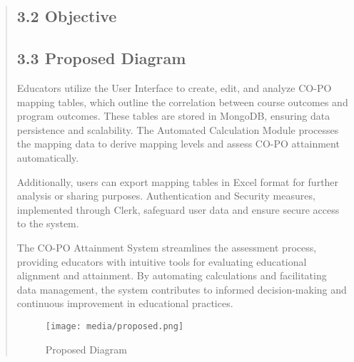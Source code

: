 \documentclass[12pt]{report}
\begin{document}
\begin{quote}
		\clearpage
		
		\subsection{3.2 Objective}
		\hspace{1cm}
		\clearpage
		
		\subsection{3.3 Proposed Diagram}
		\hspace{1cm}Educators utilize the User Interface to create, edit, and analyze CO-PO mapping tables, which outline the correlation between course outcomes and program outcomes. These tables are stored in MongoDB, ensuring data persistence and scalability. The Automated Calculation Module processes the mapping data to derive mapping levels and assess CO-PO attainment automatically.
		
		Additionally, users can export mapping tables in Excel format for further analysis or sharing purposes. Authentication and Security measures, implemented through Clerk, safeguard user data and ensure secure access to the system.
		
		The CO-PO Attainment System streamlines the assessment process, providing educators with intuitive tools for evaluating educational alignment and attainment. By automating calculations and facilitating data management, the system contributes to informed decision-making and continuous improvement in educational practices.
		\\[15ex]
		\begin{figure}
			\centering
			\texttt{[image: media/proposed.png]}\\
			\caption{Proposed Diagram}
		\end{figure}
		

\end{quote}
\end{document}
